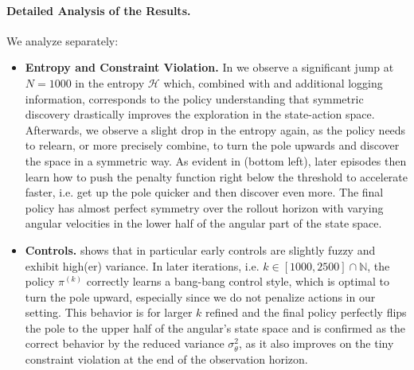 \documentclass{article}
\theoremstyle{plain}
\theoremstyle{definition}
\theoremstyle{remark}
\def\NN{{\mathbb{N}}}
\def\NN{{\mathbb{N}}}
\def\HH{{\mathcal{H}}}
\begin{document}
\paragraph{Detailed Analysis of the Results.}
We analyze separately:
\begin{itemize}
 \item \textbf{Entropy and Constraint Violation.}
       In  we observe a significant jump at $N=1000$
       in the entropy $\HH$ which, combined with
        and additional logging information,
       corresponds to the policy understanding that symmetric discovery
       drastically improves the exploration in the state-action space. Afterwards,
       we observe a slight drop in the entropy again, as the policy needs to
       relearn, or more precisely combine, to turn the pole upwards and discover
       the space in a symmetric way. As evident in
        (bottom left), later episodes
       then learn how to push the penalty function right below the threshold to
       accelerate faster, i.e. get up the pole quicker and then discover even
       more. The final policy has almost perfect symmetry over the rollout horizon
       with varying angular velocities in the lower half of the angular part of
       the state space.
 \item  \textbf{Controls.}  shows that
       in particular early controls are slightly fuzzy and exhibit high(er) variance.
       In later iterations, i.e. $k \in [1000, 2500] \cap \NN$,
       the policy $\pi^{(k)}$ correctly learns
       a bang-bang control style, which is optimal to turn the pole upward, especially
       since we do not penalize actions in our setting. This behavior is for larger $k$
       refined and the final policy perfectly flips the pole to the upper half of
       the angular's state space and is confirmed as the correct behavior by
       the reduced variance $\sigma^2_{\theta}$, as it also improves on the tiny
       constraint violation at the end of the observation horizon.
\end{itemize}
\end{document}
